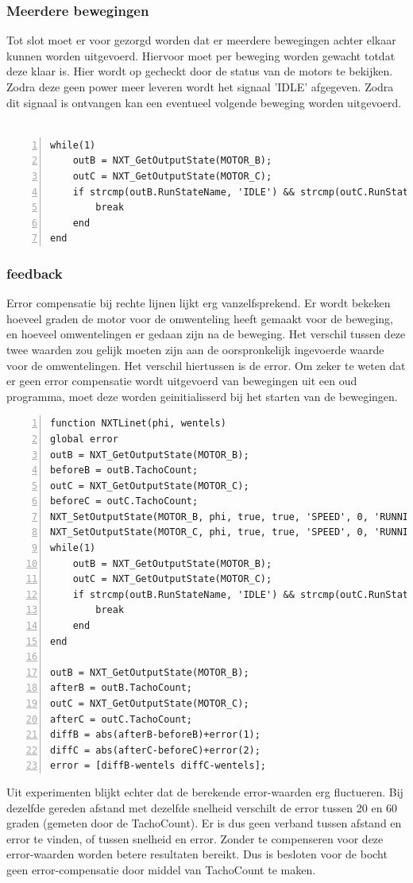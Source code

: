 \documentclass[a4paper]{article}
\begin{document}
\subsubsection{Meerdere bewegingen}
Tot slot moet er voor gezorgd worden dat er meerdere bewegingen achter elkaar kunnen worden uitgevoerd. Hiervoor moet per beweging worden gewacht totdat deze klaar is. Hier wordt op gecheckt door de status van de motors te bekijken. Zodra deze geen power meer leveren wordt het signaal 'IDLE' afgegeven. Zodra dit signaal is ontvangen kan een eventueel volgende beweging worden uitgevoerd.
\\\\
\begin{lstlisting}[caption=Meerdere moves, label=lst:moves, numbers=left]
while(1)
    outB = NXT_GetOutputState(MOTOR_B);
    outC = NXT_GetOutputState(MOTOR_C);
    if strcmp(outB.RunStateName, 'IDLE') && strcmp(outC.RunStateName, 'IDLE')
        break
    end
end
\end{lstlisting}
\subsubsection{feedback}
Error compensatie bij rechte lijnen lijkt erg vanzelfsprekend. Er wordt bekeken hoeveel graden de motor voor de omwenteling heeft gemaakt voor de beweging, en hoeveel omwentelingen er gedaan zijn na de beweging. Het verschil tussen deze twee waarden zou gelijk moeten zijn aan de oorspronkelijk ingevoerde waarde voor de omwentelingen. Het verschil hiertussen is de error. Om zeker te weten dat er geen error compensatie wordt uitgevoerd van bewegingen uit een oud programma, moet deze worden geinitialisserd bij het starten van de bewegingen. 
\begin{lstlisting}[caption=Error compensatie bij een lijn, label=lst:lineerror, numbers=left]
function NXTLinet(phi, wentels)
global error
outB = NXT_GetOutputState(MOTOR_B);
beforeB = outB.TachoCount;
outC = NXT_GetOutputState(MOTOR_C);
beforeC = outC.TachoCount;
NXT_SetOutputState(MOTOR_B, phi, true, true, 'SPEED', 0, 'RUNNING', wentels-error(1), 'dontreply');
NXT_SetOutputState(MOTOR_C, phi, true, true, 'SPEED', 0, 'RUNNING', wentels-error(2), 'dontreply');
while(1)
    outB = NXT_GetOutputState(MOTOR_B);
    outC = NXT_GetOutputState(MOTOR_C);
    if strcmp(outB.RunStateName, 'IDLE') && strcmp(outC.RunStateName, 'IDLE')
        break
    end
end

outB = NXT_GetOutputState(MOTOR_B);
afterB = outB.TachoCount;
outC = NXT_GetOutputState(MOTOR_C);
afterC = outC.TachoCount;
diffB = abs(afterB-beforeB)+error(1);
diffC = abs(afterC-beforeC)+error(2);
error = [diffB-wentels diffC-wentels];
\end{lstlisting}
Uit experimenten blijkt echter dat de berekende error-waarden erg fluctueren. Bij dezelfde gereden afstand met dezelfde snelheid verschilt de error tussen 20 en 60 graden (gemeten door de TachoCount). Er is dus geen verband tussen afstand en error te vinden, of tussen snelheid en error. Zonder te compenseren voor deze error-waarden worden betere resultaten bereikt. Dus is besloten voor de bocht geen error-compensatie door middel van TachoCount te maken.
\end{document}

